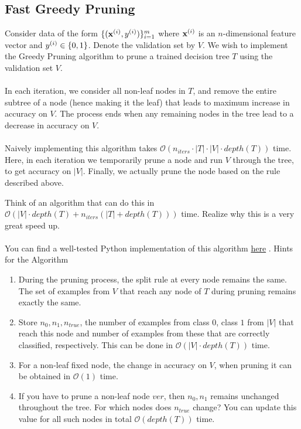 \subsection{Fast Greedy Pruning}
Consider data of the form $\{(\mathbf{x}^{(i)}, y^{(i)})\}_{i = 1}^{m}$ where $\mathbf{x}^{(i)}$ is an $n$-dimensional feature vector and $y^{(i)} \in \{0, 1\}$. Denote the validation set by $V$. We wish to implement the Greedy Pruning algorithm to prune a trained decision tree $T$ using the validation set $V$.\\ \\
In each iteration, we consider all non-leaf nodes in $T$, and remove the entire subtree of a node (hence making it the leaf) that leads to maximum increase in accuracy on $V$. The process ends when any remaining nodes in the tree lead to a decrease in accuracy on $V$.\\\\
Naively implementing this algorithm takes $\mathcal{O}(n_{iters} \cdot |T| \cdot |V|\cdot depth(T))$ time. Here, in each iteration we temporarily prune a node and run $V$ through the tree, to get accuracy on $|V|$. Finally, we actually prune the node based on the rule described above. 

Think of an algorithm that can do this in $\mathcal{O}(|V| \cdot depth(T) + n_{iters} (|T| + depth(T)))$ time. Realize why this is a very great speed up.\\\\
You can find a well-tested Python implementation of this algorithm \href{https://github.com/Harshit0143/Machine-Learning-Assignments/blob/76c2e67599deeeebfd6a1ae3033da8f0f2709b4f/Assignment3/q1/pruning.py#L287}{here} \cite{HarshitGoyal}.
Hints for the Algorithm
\begin{enumerate}
    \item During the pruning process, the split rule at every node remains the same. The set of examples from $V$ that reach any node of $T$ during pruning remains exactly the same.

    \item Store $n_0, n_1, n_{true}$, the number of examples from class $0$, class $1$ from $|V|$ that reach this node and number of examples from these that are correctly classified, respectively. This can be done in $\mathcal{O}(|V| \cdot depth(T))$ time.

    \item For a non-leaf fixed node, the change in accuracy on $V$, when pruning it can be obtained in $\mathcal{O}(1)$ time.

    \item If you have to prune a non-leaf node $ver$, then $n_0, n_1$ remains unchanged throughout the tree. For which nodes does $n_{true}$ change? You can update this value for all such nodes in total $\mathcal{O}(depth(T))$ time. 
\end{enumerate}


